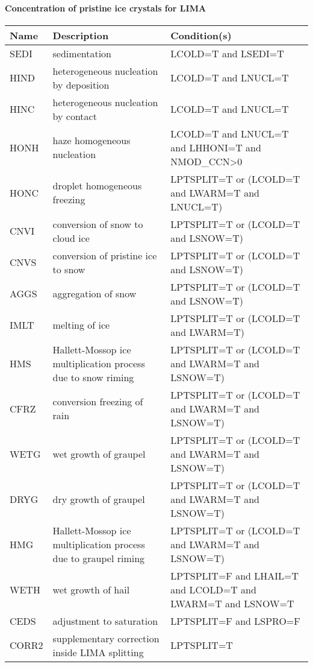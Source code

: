 \paragraph{Concentration of pristine ice crystals for LIMA}
\mbox{} %

\begin{longtable} {|p{}|p{}|p{}|}
\hline
Name & Description & Condition(s) \\
\hline \hline
\endhead
SEDI   & sedimentation                                  & LCOLD=T and LSEDI=T \\\hline
HIND   & heterogeneous nucleation by deposition         & LCOLD=T and LNUCL=T \\\hline
HINC   & heterogeneous nucleation by contact            & LCOLD=T and LNUCL=T \\\hline
HONH   & haze homogeneous nucleation                    & LCOLD=T and LNUCL=T and LHHONI=T and NMOD\_CCN>0 \\\hline
HONC   & droplet homogeneous freezing                   & LPTSPLIT=T or (LCOLD=T and LWARM=T and LNUCL=T) \\\hline
CNVI   & conversion of snow to cloud ice                & LPTSPLIT=T or (LCOLD=T and LSNOW=T) \\\hline
CNVS   & conversion of pristine ice to snow             & LPTSPLIT=T or (LCOLD=T and LSNOW=T) \\\hline
AGGS   & aggregation of snow                            & LPTSPLIT=T or (LCOLD=T and LSNOW=T) \\\hline
IMLT   & melting of ice                                 & LPTSPLIT=T or (LCOLD=T and LWARM=T) \\\hline
HMS    & Hallett-Mossop ice multiplication process due to snow riming    & LPTSPLIT=T or (LCOLD=T and LWARM=T and LSNOW=T) \\\hline
CFRZ   & conversion freezing of rain                    & LPTSPLIT=T or (LCOLD=T and LWARM=T and LSNOW=T) \\\hline
WETG   & wet growth of graupel                          & LPTSPLIT=T or (LCOLD=T and LWARM=T and LSNOW=T) \\\hline
DRYG   & dry growth of graupel                          & LPTSPLIT=T or (LCOLD=T and LWARM=T and LSNOW=T) \\\hline
HMG    & Hallett-Mossop ice multiplication process due to graupel riming & LPTSPLIT=T or (LCOLD=T and LWARM=T and LSNOW=T) \\\hline
WETH   & wet growth of hail                             & LPTSPLIT=F and LHAIL=T and LCOLD=T and LWARM=T and LSNOW=T \\\hline
CEDS   & adjustment to saturation                       & LPTSPLIT=F and LSPRO=F \\\hline
CORR2  & supplementary correction inside LIMA splitting & LPTSPLIT=T \\\hline
\end{longtable}

